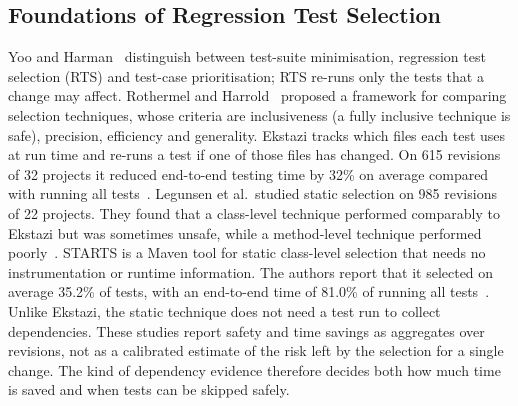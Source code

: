 \documentclass[conference]{IEEEtran}
\begin{document}
\subsection{Foundations of Regression Test Selection}
Yoo and Harman~\cite{yoo2012survey} distinguish between test-suite minimisation, regression test selection (RTS) and test-case prioritisation; RTS re-runs only the tests that a change may affect. Rothermel and Harrold~\cite{rothermel1996analyzing} proposed a framework for comparing selection techniques, whose criteria are inclusiveness (a fully inclusive technique is safe), precision, efficiency and generality. Ekstazi tracks which files each test uses at run time and re-runs a test if one of those files has changed. On 615 revisions of 32 projects it reduced end-to-end testing time by 32\% on average compared with running all tests~\cite{gligoric2015ekstazi}. Legunsen et al.\ studied static selection on 985 revisions of 22 projects. They found that a class-level technique performed comparably to Ekstazi but was sometimes unsafe, while a method-level technique performed poorly~\cite{legunsen2016static}. STARTS is a Maven tool for static class-level selection that needs no instrumentation or runtime information. The authors report that it selected on average 35.2\% of tests, with an end-to-end time of 81.0\% of running all tests~\cite{legunsen2017starts}. Unlike Ekstazi, the static technique does not need a test run to collect dependencies. These studies report safety and time savings as aggregates over revisions, not as a calibrated estimate of the risk left by the selection for a single change. The kind of dependency evidence therefore decides both how much time is saved and when tests can be skipped safely.
\end{document}
